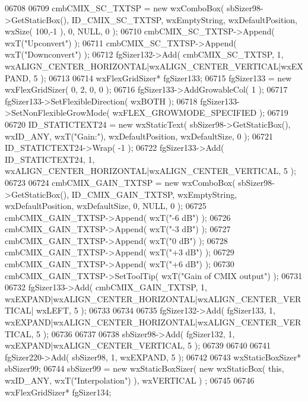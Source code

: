 \begin{DoxyCode}
06708     
06709     cmbCMIX_SC_TXTSP = \textcolor{keyword}{new} wxComboBox( sbSizer98->GetStaticBox(), 
      ID_CMIX_SC_TXTSP, wxEmptyString, wxDefaultPosition, wxSize( 100,-1 ), 0, NULL, 0 );
06710     cmbCMIX_SC_TXTSP->Append( wxT(\textcolor{stringliteral}{"Upconvert"}) );
06711     cmbCMIX_SC_TXTSP->Append( wxT(\textcolor{stringliteral}{"Downconvert"}) );
06712     fgSizer132->Add( cmbCMIX_SC_TXTSP, 1, wxALIGN\_CENTER\_HORIZONTAL|wxALIGN\_CENTER\_VERTICAL|wxEXPAND, 5 );
06713     
06714     wxFlexGridSizer* fgSizer133;
06715     fgSizer133 = \textcolor{keyword}{new} wxFlexGridSizer( 0, 2, 0, 0 );
06716     fgSizer133->AddGrowableCol( 1 );
06717     fgSizer133->SetFlexibleDirection( wxBOTH );
06718     fgSizer133->SetNonFlexibleGrowMode( wxFLEX\_GROWMODE\_SPECIFIED );
06719     
06720     ID_STATICTEXT24 = \textcolor{keyword}{new} wxStaticText( sbSizer98->GetStaticBox(), wxID\_ANY, wxT(\textcolor{stringliteral}{"Gain:"}), 
      wxDefaultPosition, wxDefaultSize, 0 );
06721     ID_STATICTEXT24->Wrap( -1 );
06722     fgSizer133->Add( ID_STATICTEXT24, 1, wxALIGN\_CENTER\_HORIZONTAL|wxALIGN\_CENTER\_VERTICAL, 5 );
06723     
06724     cmbCMIX_GAIN_TXTSP = \textcolor{keyword}{new} wxComboBox( sbSizer98->GetStaticBox(), 
      ID_CMIX_GAIN_TXTSP, wxEmptyString, wxDefaultPosition, wxDefaultSize, 0, NULL, 0 );
06725     cmbCMIX_GAIN_TXTSP->Append( wxT(\textcolor{stringliteral}{"-6 dB"}) );
06726     cmbCMIX_GAIN_TXTSP->Append( wxT(\textcolor{stringliteral}{"-3 dB"}) );
06727     cmbCMIX_GAIN_TXTSP->Append( wxT(\textcolor{stringliteral}{"0 dB"}) );
06728     cmbCMIX_GAIN_TXTSP->Append( wxT(\textcolor{stringliteral}{"+3 dB"}) );
06729     cmbCMIX_GAIN_TXTSP->Append( wxT(\textcolor{stringliteral}{"+6 dB"}) );
06730     cmbCMIX_GAIN_TXTSP->SetToolTip( wxT(\textcolor{stringliteral}{"Gain of CMIX output"}) );
06731     
06732     fgSizer133->Add( cmbCMIX_GAIN_TXTSP, 1, wxEXPAND|wxALIGN\_CENTER\_HORIZONTAL|wxALIGN\_CENTER\_VERTICAL|
      wxLEFT, 5 );
06733     
06734     
06735     fgSizer132->Add( fgSizer133, 1, wxEXPAND|wxALIGN\_CENTER\_HORIZONTAL|wxALIGN\_CENTER\_VERTICAL, 5 );
06736     
06737     
06738     sbSizer98->Add( fgSizer132, 1, wxEXPAND|wxALIGN\_CENTER\_VERTICAL, 5 );
06739     
06740     
06741     fgSizer220->Add( sbSizer98, 1, wxEXPAND, 5 );
06742     
06743     wxStaticBoxSizer* sbSizer99;
06744     sbSizer99 = \textcolor{keyword}{new} wxStaticBoxSizer( \textcolor{keyword}{new} wxStaticBox( \textcolor{keyword}{this}, wxID\_ANY, wxT(\textcolor{stringliteral}{"Interpolation"}) ), wxVERTICAL )
      ;
06745     
06746     wxFlexGridSizer* fgSizer134;

\end{DoxyCode}
